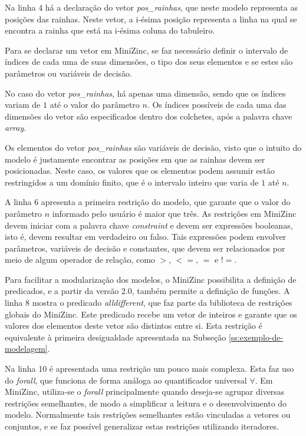 Na linha 4 há a declaração do vetor \textit{pos\_rainhas}, que neste modelo representa as posições das rainhas. Neste vetor, a i-ésima posição representa a linha na qual se encontra a rainha que está na i-ésima coluna do tabuleiro.
  
Para se declarar um vetor em MiniZinc, se faz necessário definir o intervalo de índices de cada uma de suas dimensões, o tipo dos seus elementos e se estes são parâmetros ou variáveis de decisão.

No caso do vetor \textit{pos\_rainhas}, há apenas uma dimensão, sendo que os índices variam de $1$ até o valor do parâmetro $n$. Os índices possíveis de cada uma das dimensões do vetor são especificados dentro dos colchetes, após a palavra chave \textit{array}.

Os elementos do vetor \textit{pos\_rainhas} são variáveis de decisão, visto que o intuito do modelo é justamente encontrar as posições em que as rainhas devem ser posicionadas. Neste caso, os valores que os elementos podem assumir estão restringidos a um domínio finito, que é o intervalo inteiro que varia de $1$ até $n$.

A linha 6 apresenta a primeira restrição do modelo, que garante que o valor do parâmetro $n$ informado pelo usuário é maior que três. As restrições em MiniZinc devem iniciar com a palavra chave \textit{constraint} e devem ser expressões booleanas, isto é, devem resultar em verdadeiro ou falso. Tais expressões podem envolver parâmetros, variáveis de decisão e constantes, que devem ser relacionados por meio de algum operador de relação, como $>$, $<=$, $=$ e $!=$.

Para facilitar a modularização dos modelos, o MiniZinc possibilita a definição de predicados, e a partir da versão 2.0, também permite a definição de funções. A linha 8 mostra o predicado \textit{alldifferent}, que faz parte da biblioteca de restrições globais do MiniZinc. Este predicado recebe um vetor de inteiros e garante que os valores dos elementos deste vetor são distintos entre si. Esta restrição é equivalente à primeira desigualdade apresentada na Subseção \ref{ss:exemplo-de-modelagem}.

Na linha 10 é apresentada uma restrição um pouco mais complexa. Esta faz uso do \textit{forall}, que funciona de forma análoga ao quantificador universal $\forall$. Em MiniZinc, utiliza-se o \textit{forall} principalmente quando deseja-se agrupar diversas restrições semelhantes, de modo a simplificar a leitura e o desenvolvimento do modelo. Normalmente tais restrições semelhantes estão vinculadas a vetores ou conjuntos, e se faz possível generalizar estas restrições utilizando iteradores.

